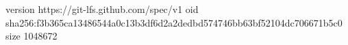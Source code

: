 version https://git-lfs.github.com/spec/v1
oid sha256:f3b365ca13486544a0c13b3df6d2a2dedbd574746bb63bf52104dc706671b5c0
size 1048672
